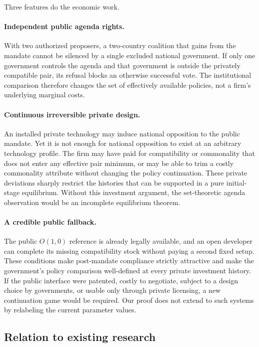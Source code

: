 Three features do the economic work.

\paragraph{Independent public agenda rights.}
With two authorized proposers, a two-country coalition
that gains from the mandate cannot be silenced by
a single excluded national government.
If only one government controls the agenda and that
government is outside the privately compatible pair,
its refusal blocks an otherwise successful vote.
The institutional comparison therefore changes the
set of effectively available policies, not a firm's
underlying marginal costs.

\paragraph{Continuous irreversible private design.}
An installed private technology may induce national
opposition to the public mandate. Yet it is not enough
for national opposition to exist at an arbitrary
technology profile. The firm may have paid for
compatibility or commonality that does not enter any
effective pair minimum, or may be able to trim a
costly commonality attribute without changing the
policy continuation. These private deviations sharply
restrict the histories that can be supported in a
pure initial-stage equilibrium. Without this
investment argument, the set-theoretic agenda
observation would be an incomplete equilibrium
theorem.

\paragraph{A credible public fallback.}
The public \(O(1,0)\) reference is already legally
available, and an open developer can complete its
missing compatibility stock without paying a second
fixed setup. These conditions make post-mandate
compliance strictly attractive and make the
government's policy comparison well-defined
at every private investment history. If the public
interface were patented, costly to negotiate, subject
to a design choice by governments, or usable only
through private licensing, a new continuation game
would be required. Our proof does not extend to such
systems by relabeling the current parameter values.

\subsection{Relation to existing research}\label{subsec:literature}

